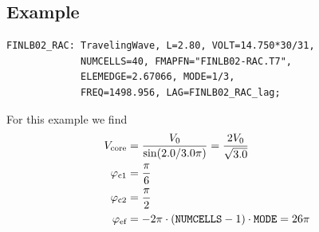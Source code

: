 \subsection*{Example}
\begin{fmpage}
\begin{verbatim}
FINLB02_RAC: TravelingWave, L=2.80, VOLT=14.750*30/31,
             NUMCELLS=40, FMAPFN="FINLB02-RAC.T7",
             ELEMEDGE=2.67066, MODE=1/3,
             FREQ=1498.956, LAG=FINLB02_RAC_lag;
\end{verbatim}
\end{fmpage}
For this example we find
\begin{align*}
  V_\text{core} &= \frac{V_{0}}{\sin(2.0/3.0 \pi)} = \frac{2 V_{0}}{\sqrt{3.0}}\\
  \varphi_\text{c1} &= \frac{\pi}{6}\\
  \varphi_\text{c2} &= \frac{\pi}{2}\\
  \varphi_\text{ef} &= - 2\pi \cdot(\text{\keyword{NUMCELLS}} - 1) \cdot \text{\keyword{MODE}} = 26\pi
\end{align*}
